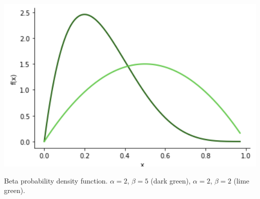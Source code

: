\documentclass{tufte-handout}
\begin{document}
\begin{marginfigure}
\centering
\includegraphics{fig/beta3.png}

\caption{Beta probability density function. $\alpha=2$, $\beta=5$ (dark green), $\alpha=2$, $\beta=2$ (lime green).
}
\end{marginfigure}
\end{document}
